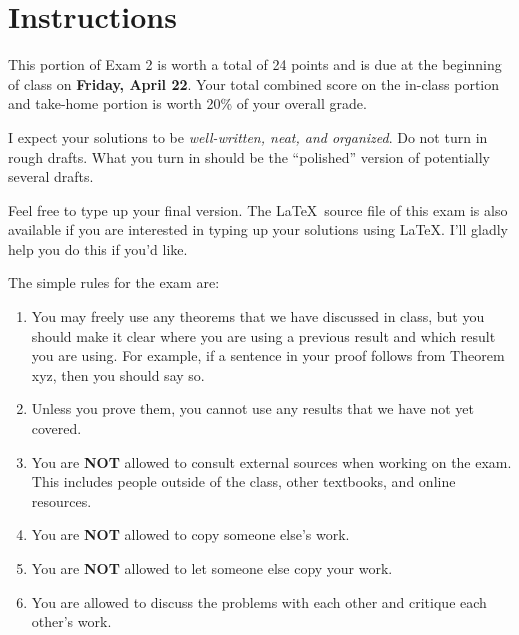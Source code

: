 \documentclass[11pt]{scrartcl}
\theoremstyle{definition}
\begin{document}
\begin{center}

  
  \bigskip
  

\end{center}

\section*{Instructions}

This portion of Exam 2 is worth a total of 24 points and is due at the beginning of class on \textbf{Friday, April 22}.  Your total combined score on the in-class portion and take-home portion is worth 20\% of your overall grade.  

\bigskip

I expect your solutions to be \emph{well-written, neat, and organized}.  Do not turn in rough drafts.  What you turn in should be the ``polished'' version of potentially several drafts.  
 
\bigskip

Feel free to type up your final version.  The \LaTeX\ source file of this exam is also available if you are interested in typing up your solutions using \LaTeX.  I'll gladly help you do this if you'd like.

\bigskip

The simple rules for the exam are:

\begin{enumerate}
\item You may freely use any theorems that we have discussed in class, but you should make it clear where you are using a previous result and which result you are using.  For example, if a sentence in your proof follows from Theorem xyz, then you should say so. 
\item Unless you prove them, you cannot use any results that we have not yet covered.
\item You are \textbf{NOT} allowed to consult external sources when working on the exam.  This includes people outside of the class, other textbooks, and online resources.
\item You are \textbf{NOT} allowed to copy someone else's work.
\item You are \textbf{NOT} allowed to let someone else copy your work.
\item You are allowed to discuss the problems with each other and critique each other's work.
\end{enumerate}
\end{document}
